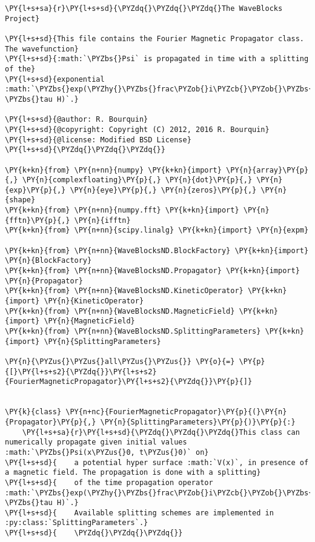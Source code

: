 \begin{Verbatim}[commandchars=\\\{\}]
\PY{l+s+sa}{r}\PY{l+s+sd}{\PYZdq{}\PYZdq{}\PYZdq{}The WaveBlocks Project}

\PY{l+s+sd}{This file contains the Fourier Magnetic Propagator class. The wavefunction}
\PY{l+s+sd}{:math:`\PYZbs{}Psi` is propagated in time with a splitting of the}
\PY{l+s+sd}{exponential :math:`\PYZbs{}exp(\PYZhy{}\PYZbs{}frac\PYZob{}i\PYZcb{}\PYZob{}\PYZbs{}varepsilon\PYZca{}2\PYZcb{} \PYZbs{}tau H)`.}

\PY{l+s+sd}{@author: R. Bourquin}
\PY{l+s+sd}{@copyright: Copyright (C) 2012, 2016 R. Bourquin}
\PY{l+s+sd}{@license: Modified BSD License}
\PY{l+s+sd}{\PYZdq{}\PYZdq{}\PYZdq{}}

\PY{k+kn}{from} \PY{n+nn}{numpy} \PY{k+kn}{import} \PY{n}{array}\PY{p}{,} \PY{n}{complexfloating}\PY{p}{,} \PY{n}{dot}\PY{p}{,} \PY{n}{exp}\PY{p}{,} \PY{n}{eye}\PY{p}{,} \PY{n}{zeros}\PY{p}{,} \PY{n}{shape}
\PY{k+kn}{from} \PY{n+nn}{numpy.fft} \PY{k+kn}{import} \PY{n}{fftn}\PY{p}{,} \PY{n}{ifftn}
\PY{k+kn}{from} \PY{n+nn}{scipy.linalg} \PY{k+kn}{import} \PY{n}{expm}

\PY{k+kn}{from} \PY{n+nn}{WaveBlocksND.BlockFactory} \PY{k+kn}{import} \PY{n}{BlockFactory}
\PY{k+kn}{from} \PY{n+nn}{WaveBlocksND.Propagator} \PY{k+kn}{import} \PY{n}{Propagator}
\PY{k+kn}{from} \PY{n+nn}{WaveBlocksND.KineticOperator} \PY{k+kn}{import} \PY{n}{KineticOperator}
\PY{k+kn}{from} \PY{n+nn}{WaveBlocksND.MagneticField} \PY{k+kn}{import} \PY{n}{MagneticField}
\PY{k+kn}{from} \PY{n+nn}{WaveBlocksND.SplittingParameters} \PY{k+kn}{import} \PY{n}{SplittingParameters}

\PY{n}{\PYZus{}\PYZus{}all\PYZus{}\PYZus{}} \PY{o}{=} \PY{p}{[}\PY{l+s+s2}{\PYZdq{}}\PY{l+s+s2}{FourierMagneticPropagator}\PY{l+s+s2}{\PYZdq{}}\PY{p}{]}


\PY{k}{class} \PY{n+nc}{FourierMagneticPropagator}\PY{p}{(}\PY{n}{Propagator}\PY{p}{,} \PY{n}{SplittingParameters}\PY{p}{)}\PY{p}{:}
    \PY{l+s+sa}{r}\PY{l+s+sd}{\PYZdq{}\PYZdq{}\PYZdq{}This class can numerically propagate given initial values :math:`\PYZbs{}Psi(x\PYZus{}0, t\PYZus{}0)` on}
\PY{l+s+sd}{    a potential hyper surface :math:`V(x)`, in presence of a magnetic field. The propagation is done with a splitting}
\PY{l+s+sd}{    of the time propagation operator :math:`\PYZbs{}exp(\PYZhy{}\PYZbs{}frac\PYZob{}i\PYZcb{}\PYZob{}\PYZbs{}varepsilon\PYZca{}2\PYZcb{} \PYZbs{}tau H)`.}
\PY{l+s+sd}{    Available splitting schemes are implemented in :py:class:`SplittingParameters`.}
\PY{l+s+sd}{    \PYZdq{}\PYZdq{}\PYZdq{}}


\end{Verbatim}
